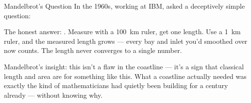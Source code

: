 \begin{frame}{Mandelbrot's Question}
  \small
  In the 1960s, working at IBM,  asked a
  deceptively simple question:

  \begin{center}
  \end{center}

  \pause
  \vspace{0.2cm}
  The honest answer: . Measure
  with a 100~km ruler, get one length. Use a 1~km ruler, and the
  measured length grows — every bay and inlet you'd smoothed over
  now counts. The length never converges to a single number.

  \pause
  \vspace{0.2cm}
  Mandelbrot's insight: this isn't a flaw in the coastline — it's a
  sign that classical length and area are 
  for something like this. What a coastline actually needed was
  exactly the kind of  mathematicians
  had quietly been building for a century already --- without knowing
  why.
\end{frame}

